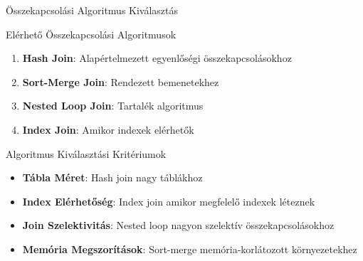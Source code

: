 \documentclass[aspectratio=169]{beamer}
\begin{document}
\begin{frame}{Összekapcsolási Algoritmus Kiválasztás}
\begin{block}{Elérhető Összekapcsolási Algoritmusok}
\begin{enumerate}
    \item \textbf{Hash Join}: Alapértelmezett egyenlőségi összekapcsolásokhoz
    \item \textbf{Sort-Merge Join}: Rendezett bemenetekhez
    \item \textbf{Nested Loop Join}: Tartalék algoritmus
    \item \textbf{Index Join}: Amikor indexek elérhetők
\end{enumerate}
\end{block}

\begin{block}{Algoritmus Kiválasztási Kritériumok}
\begin{itemize}
    \item \textbf{Tábla Méret}: Hash join nagy táblákhoz
    \item \textbf{Index Elérhetőség}: Index join amikor megfelelő indexek léteznek
    \item \textbf{Join Szelektivitás}: Nested loop nagyon szelektív összekapcsolásokhoz
    \item \textbf{Memória Megszorítások}: Sort-merge memória-korlátozott környezetekhez
\end{itemize}
\end{block}
\end{frame}
\end{document}
